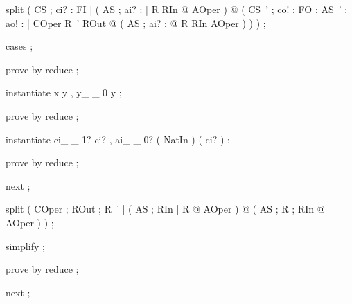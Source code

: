 \begin{zproof}[BSCorrectnessEquiv]

 split ( \forall CS ; ci? : FI | ( \forall AS ; ai? : \nat | R \land RIn @ \pre AOper ) @ ( \forall CS~' ; co! : FO ; AS~' ; ao! : \nat | COper \land R~' \land ROut @ ( \exists AS ; ai? : \nat @ R \land RIn \land AOper ) ) ) ;
 
 cases ;
 
 prove by reduce ;
 
 instantiate x  \ran y , y\_ \_ 0  y ;
 
 prove by reduce ;
 
 instantiate ci\_ \_ 1?  ci? , ai\_ \_ 0?  ( NatIn \inv ) ( ci? ) ;
 
 prove by reduce ;
 
 next ;
 
 split ( \forall COper ; ROut ; R~' | ( \forall AS ; RIn | R @ \pre AOper ) @ ( \exists AS ; R ; RIn @ AOper ) ) ;
 
 simplify ;
 
 prove by reduce ;
 
 next ;
 

\end{zproof}


